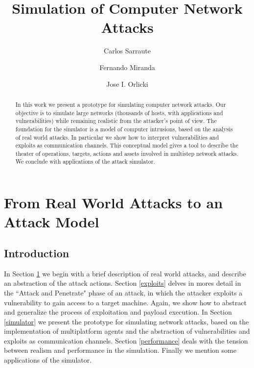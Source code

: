 \documentclass{llncs}
\begin{document}
\title{Simulation of Computer Network Attacks} 
\author{
Carlos Sarraute 
\and Fernando Miranda  
\and Jose I. Orlicki  
}
\maketitle


\begin{abstract}

In this work we present a prototype for simulating computer network attacks.
Our objective is to simulate large networks 
(thousands of hosts, with applications and vulnerabilities)
while remaining realistic from the attacker's point of view.
The foundation for the simulator is a model of computer intrusions,
based on the analysis of real world attacks.
In particular we show how  to interpret vulnerabilities and exploits
as communication channels.
This conceptual model gives a tool to describe the theater of operations, 
targets, actions and assets involved in 
multistep network attacks.
We conclude with applications of the attack simulator.

\end{abstract}



\section{From Real World Attacks to an Attack Model} \label{attacks}

\subsection{Introduction}

In Section \ref{attacks} we begin with a brief description of real world attacks,
and describe an abstraction of the attack actions.
Section \ref{exploits} delves in mores detail in the ``Attack and Penetrate" phase of an attack,
in which the attacker exploits a  vulnerability to gain access to a target machine.
Again, we show how to abstract and generalize the process of exploitation and payload execution.
In Section \ref{simulator} we present the prototype for simulating network attacks,
based on the implementation of multiplatform agents
and the abstraction of vulnerabilities and exploits as communication channels.
Section \ref{performance} deals with the tension between realism and performance
in the simulation.
Finally we mention some applications of the simulator.
\end{document}
